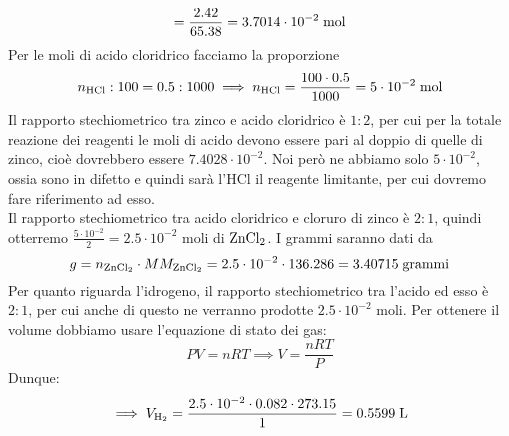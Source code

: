 \begin{soluzione}
\begin{equation*}
        =\frac{2.42}{65.38}
        =3.7014 \cdot 10^{-2} \; \rm mol
    \end{equation*}
    Per le moli di acido cloridrico facciamo la proporzione
    \begin{equation*}
        n_{\rm HCl}:100=0.5:1000
        \implies
        n_{\rm HCl}=\frac{100 \cdot 0.5}{1000}
        =5 \cdot 10^{-2} \; \rm mol
    \end{equation*}
    Il rapporto stechiometrico tra zinco e acido cloridrico è $1:2$, per cui per la totale reazione dei reagenti le moli di acido devono essere pari al doppio di quelle di zinco, cioè dovrebbero essere $7.4028 \cdot 10^{-2}$. Noi però ne abbiamo solo $5 \cdot 10^{-2}$, ossia sono in difetto e quindi sarà l'HCl il reagente limitante, per cui dovremo fare riferimento ad esso.\\
    Il rapporto stechiometrico tra acido cloridrico e cloruro di zinco è $2:1$, quindi otterremo $\frac{5\cdot 10^{-2}}{2}=2.5 \cdot 10^{-2}$ moli di $\rm ZnCl_2$. I grammi saranno dati da
    \begin{equation*}
        g=n_{\rm ZnCl_2} \cdot MM_{\rm ZnCl_2}
        =2.5 \cdot 10^{-2} \cdot 136.286
        =3.40715 \; \rm grammi
    \end{equation*}
    Per quanto riguarda l'idrogeno, il rapporto stechiometrico tra l'acido ed esso è $2:1$, per cui anche di questo ne verranno prodotte $2.5 \cdot 10^{-2}$ moli. Per ottenere il volume dobbiamo usare l'equazione di stato dei gas:
    \begin{equation*}
        PV=nRT \implies V=\frac{nRT}{P}
    \end{equation*}
    Dunque:
    \begin{equation*}
        \implies V_{\rm H_2}
        =\frac{2.5 \cdot 10^{-2} \cdot 0.082 \cdot 273.15}{1}
        =0.5599 \; \rm L
    \end{equation*}
\end{soluzione}

\newpage

